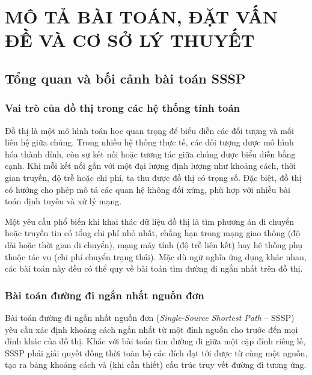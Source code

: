 
\chapter{MÔ TẢ BÀI TOÁN, ĐẶT VẤN ĐỀ VÀ CƠ SỞ LÝ THUYẾT}
\label{chap:co-so-ly-thuyet}

\section{Tổng quan và bối cảnh bài toán SSSP}
\label{sec:tong-quan-sssp}

\subsection{Vai trò của đồ thị trong các hệ thống tính toán}

Đồ thị là một mô hình toán học quan trọng để biểu diễn các đối tượng và mối liên hệ giữa chúng. Trong nhiều hệ thống thực tế, các đối tượng được mô hình hóa thành đỉnh, còn sự kết nối hoặc tương tác giữa chúng được biểu diễn bằng cạnh. Khi mỗi kết nối gắn với một đại lượng định lượng như khoảng cách, thời gian truyền, độ trễ hoặc chi phí, ta thu được đồ thị có trọng số. Đặc biệt, đồ thị có hướng cho phép mô tả các quan hệ không đối xứng, phù hợp với nhiều bài toán định tuyến và xử lý mạng.

Một yêu cầu phổ biến khi khai thác dữ liệu đồ thị là tìm phương án di chuyển hoặc truyền tin có tổng chi phí nhỏ nhất, chẳng hạn trong mạng giao thông (độ dài hoặc thời gian di chuyển), mạng máy tính (độ trễ liên kết) hay hệ thống phụ thuộc tác vụ (chi phí chuyển trạng thái). Mặc dù ngữ nghĩa ứng dụng khác nhau, các bài toán này đều có thể quy về bài toán tìm đường đi ngắn nhất trên đồ thị.

\subsection{Bài toán đường đi ngắn nhất nguồn đơn}

Bài toán đường đi ngắn nhất nguồn đơn (\textit{Single-Source Shortest Path} -- SSSP) yêu cầu xác định khoảng cách ngắn nhất từ một đỉnh nguồn cho trước đến mọi đỉnh khác của đồ thị. Khác với bài toán tìm đường đi giữa một cặp đỉnh riêng lẻ, SSSP phải giải quyết đồng thời toàn bộ các đích đạt tới được từ cùng một nguồn, tạo ra bảng khoảng cách và (khi cần thiết) cấu trúc truy vết đường đi tương ứng.

